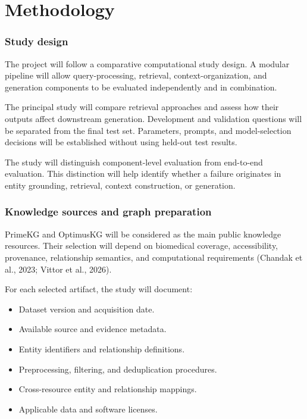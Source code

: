 \section{Methodology}\label{methodology}

\subsubsection{Study design}\label{study-design}

The project will follow a comparative computational study design. A modular pipeline will allow query-processing, retrieval, context-organization, and generation components to be evaluated independently and in combination.

The principal study will compare retrieval approaches and assess how their outputs affect downstream generation. Development and validation questions will be separated from the final test set. Parameters, prompts, and model-selection decisions will be established without using held-out test results.

The study will distinguish component-level evaluation from end-to-end evaluation. This distinction will help identify whether a failure originates in entity grounding, retrieval, context construction, or generation.

\subsubsection{Knowledge sources and graph preparation}\label{knowledge-sources-and-graph-preparation}

PrimeKG and OptimusKG will be considered as the main public knowledge resources. Their selection will depend on biomedical coverage, accessibility, provenance, relationship semantics, and computational requirements (Chandak et al., 2023; Vittor et al., 2026).

For each selected artifact, the study will document:

\begin{itemize}
\tightlist
\item
  Dataset version and acquisition date.
\item
  Available source and evidence metadata.
\item
  Entity identifiers and relationship definitions.
\item
  Preprocessing, filtering, and deduplication procedures.
\item
  Cross-resource entity and relationship mappings.
\item
  Applicable data and software licenses.
\end{itemize}

